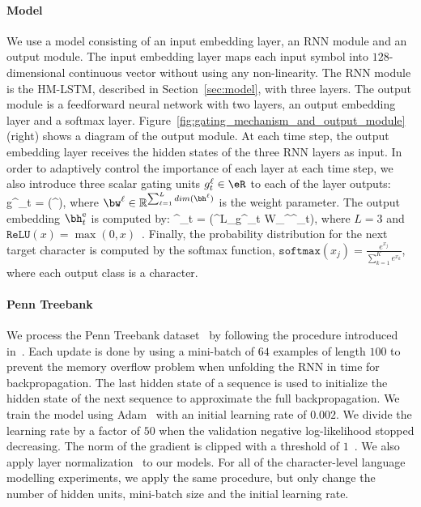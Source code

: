 \paragraph{Model}
We use a model consisting of an input embedding layer, an RNN module and an output module. The input embedding layer maps each input symbol into $128$-dimensional continuous vector without using any non-linearity. The RNN module is the HM-LSTM, described in Section~\ref{sec:model}, with three layers. The output module is a feedforward neural network with two layers, an output embedding layer and a softmax layer. 
Figure~\ref{fig:gating_mechanism_and_output_module} (right) shows a diagram of the output module. At each time step, the output embedding layer receives the hidden states of the three RNN layers as input. In order to adaptively control the importance of each layer at each time step, we also introduce three scalar gating units $g_t^\ell \in \eR$ to each of the layer outputs:
\bea
	\label{eq:scaling_unit}
	g^\ell_t = (\bw^\ell[\bh^1_t;\cdots;\bh^L_t]),
\eea
where $\bw^\ell\in\mathbb{R}^{\sum^L_{\ell=1} dim(\bh^\ell)}$ is the weight parameter. The output embedding $\bh_t^\text{e}$ is computed by:
\bea
	\label{eq:output_module}
	\bh^{}_t = \left(\sum^{L}_{}g^{\ell}_t W_{\ell}^{}\bh^{\ell}_t\right),
\eea
where $L=3$ and $\mathtt{ReLU}(x)=\max(0, x)$~\citep{nair2010rectified}. Finally, the probability distribution for the next target character is computed by the softmax function,
{\small $\mathtt{softmax}(x_j)=\frac{e^{x_j}}{\sum^K_{k=1} e^{x_k}}$}, where each output class is a character.

\paragraph{Penn Treebank} We process the Penn Treebank dataset~\citep{marcus1993building} by following the procedure introduced in~\citet{mikolov2012subword}. 
Each update is done by using a mini-batch of $64$ examples of length $100$ to prevent the memory overflow problem when unfolding the RNN in time for backpropagation. The last hidden state of a sequence is used to initialize the hidden state of the next sequence to approximate the full backpropagation. We train the model using Adam~\citep{kingma2014adam} with an initial learning rate of $0.002$. We divide the learning rate by a factor of $50$ when the validation negative log-likelihood stopped decreasing. The norm of the gradient is clipped with a threshold of $1$~\citep{mikolov2010recurrent,pascanu2012difficulty}. We also apply layer normalization~\citep{ba2016layer} to our models. For all of the character-level language modelling experiments, we apply the same procedure, but only change the number of hidden units, mini-batch size and the initial learning rate.

